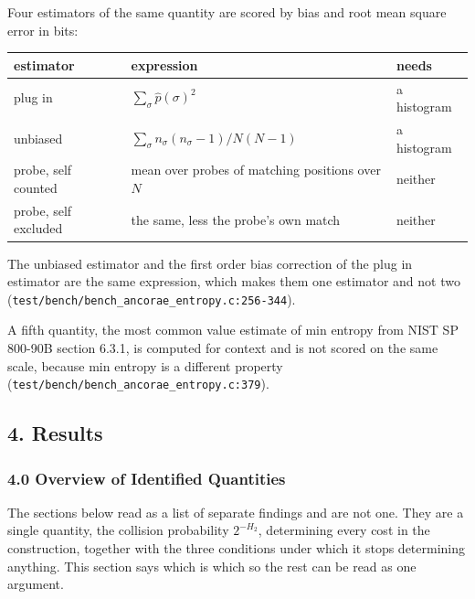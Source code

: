 Four estimators of the same quantity are scored by bias and root mean square error in bits:

\tiny
\setlength{\tabcolsep}{2pt}
\begin{longtable}{@{}>{\raggedright\arraybackslash}p{}>{\raggedright\arraybackslash}p{}>{\raggedright\arraybackslash}p{}@{}}
\toprule
estimator & expression & needs \\
\midrule
plug in & \(\sum_\sigma \hat p(\sigma)^2\) & a histogram \\
unbiased & \(\sum_\sigma n_\sigma(n_\sigma-1) / N(N-1)\) & a histogram \\
probe, self counted & mean over probes of matching positions over \(N\) & neither \\
probe, self excluded & the same, less the probe's own match & neither \\
\bottomrule
\end{longtable}
\normalsize

The unbiased estimator and the first order bias correction of the plug in estimator are the same expression, which makes them one estimator and not two (\texttt{test/\allowbreak{}bench/\allowbreak{}bench\_\allowbreak{}ancorae\_\allowbreak{}entropy.\allowbreak{}c:256-\allowbreak{}344}).

A fifth quantity, the most common value estimate of min entropy from NIST SP 800-90B section 6.3.1, is computed for context and is not scored on the same scale, because min entropy is a different property (\texttt{test/\allowbreak{}bench/\allowbreak{}bench\_\allowbreak{}ancorae\_\allowbreak{}entropy.\allowbreak{}c:379}).

\subsection{4. Results}

\subsubsection{4.0 Overview of Identified Quantities}

The sections below read as a list of separate findings and are not one. They are a single quantity, the collision probability \(2^{-H_2}\), determining every cost in the construction, together with the three conditions under which it stops determining anything. This section says which is which so the rest can be read as one argument.


